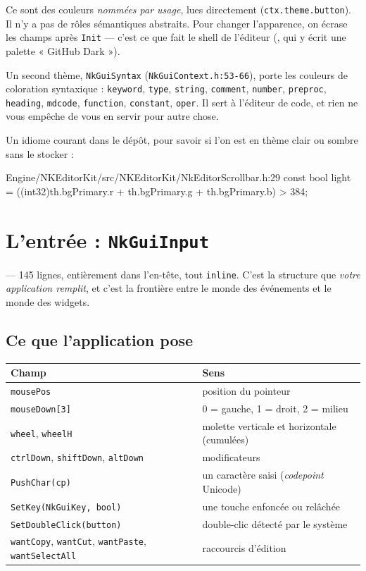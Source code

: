 Ce sont des couleurs \emph{nommées par usage}, lues directement
(\texttt{ctx.theme.button}). Il n'y a pas de rôles sémantiques abstraits. Pour
changer l'apparence, on écrase les champs après \texttt{Init} — c'est ce que fait
le shell de l'éditeur (,
qui y écrit une palette « GitHub Dark »).

Un second thème, \texttt{NkGuiSyntax} (\texttt{NkGuiContext.h:53-66}), porte les
couleurs de coloration syntaxique : \texttt{keyword}, \texttt{type},
\texttt{string}, \texttt{comment}, \texttt{number}, \texttt{preproc},
\texttt{heading}, \texttt{mdcode}, \texttt{function}, \texttt{constant},
\texttt{oper}. Il sert à l'éditeur de code, et rien ne vous empêche de vous en
servir pour autre chose.

Un idiome courant dans le dépôt, pour savoir si l'on est en thème clair ou
sombre sans le stocker :

\begin{nkcode}{Engine/NKEditorKit/src/NKEditorKit/NkEditorScrollbar.h:29}
const bool light = ((int32)th.bgPrimary.r + th.bgPrimary.g + th.bgPrimary.b) > 384;
\end{nkcode}

\section{L'entrée : \texttt{NkGuiInput}}

 — 145 lignes,
entièrement dans l'en-tête, tout \texttt{inline}. C'est la structure que
\emph{votre application remplit}, et c'est la frontière entre le monde des
événements et le monde des widgets.

\subsection{Ce que l'application pose}

\begin{center}
\begin{tabular}{@{}ll@{}}
\toprule
\textbf{Champ} & \textbf{Sens} \\
\midrule
\texttt{mousePos}                     & position du pointeur \\
\texttt{mouseDown[3]}                 & 0 = gauche, 1 = droit, 2 = milieu \\
\texttt{wheel}, \texttt{wheelH}       & molette verticale et horizontale (cumulées) \\
\texttt{ctrlDown}, \texttt{shiftDown}, \texttt{altDown} & modificateurs \\
\texttt{PushChar(cp)}                 & un caractère saisi (\emph{codepoint} Unicode) \\
\texttt{SetKey(NkGuiKey, bool)}       & une touche enfoncée ou relâchée \\
\texttt{SetDoubleClick(button)}       & double-clic détecté par le système \\
\texttt{wantCopy}, \texttt{wantCut}, \texttt{wantPaste}, \texttt{wantSelectAll} & raccourcis d'édition \\
\bottomrule
\end{tabular}
\end{center}

